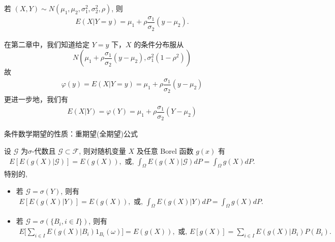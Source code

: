\documentclass[Prob-All.tex]{subfiles}
\begin{document}
\begin{frame}
	\vspace{0.3cm}
	\begin{exam}
		若 $(X,Y)\sim N (\mu_1,\mu_2,\sigma_1^2,\sigma_2^2,\rho)$, 则
		\begin{eqnarray*}
			E(X|Y=y)=\mu_1+\rho \dfrac{\sigma_1}{\sigma_2}(y-\mu_2).
		\end{eqnarray*}
	\end{exam}%
	\zheng 在第二章中，我们知道给定 $Y=y$ 下，$X$ 的条件分布服从
	\[N(\mu_1+\rho \dfrac{\sigma_1}{\sigma_2}(y-\mu_2), \sigma_1^2(1-\rho^2))\]
	\pause 故
	\begin{eqnarray*}
		\varphi(y)=E(X|Y=y)=\mu_1+\rho \dfrac{\sigma_1}{\sigma_2}(y-\mu_2)
	\end{eqnarray*}
	\pause 更进一步地，我们有
	\begin{eqnarray*}
		E(X|Y)=\varphi(Y)=\mu_1+\rho \dfrac{\sigma_1}{\sigma_2}(Y-\mu_2)
	\end{eqnarray*}
\end{frame}


\begin{frame}{条件数学期望的性质：重期望(全期望)公式}
	\begin{thm}
		设 $\mathcal{G}$ 为$\sigma$-代数且 $\mathcal{G}\subset\mathcal{F}$, 则对随机变量 $X$ 及任意 Borel 函数 $g (x)$ 有
		{\small \begin{eqnarray*}
			E[E(g(X)|\mathcal{G})]=E(g(X)), \mbox{ 或, } \int_{\Omega}E(g(X)|\mathcal{G})dP=\int_{\Omega}g(X)dP.
		\end{eqnarray*}}
		特别的,
		\begin{itemize}[<+-|alert@+>]
		\item 若 $\mathcal{G}=\sigma(Y)$, 则有
		{\small \begin{eqnarray*}
			E[E(g(X)|Y)]=E(g(X)), \mbox{ 或,  } \int_{\Omega}E(g(X)|Y)dP=\int_{\Omega}g(X)dP.
		\end{eqnarray*}}
		\item 若 $\mathcal{G}=\sigma(\{B_i, i\in I\})$, 则有
		{\small \begin{eqnarray*}
			E\bigg[\sum_{i\in I}E(g(X)|B_i)1_{B_i}(\omega)\bigg]=E(g(X)), \mbox{ 或, } E[g(X)]=\sum_{i\in I}E(g(X)|B_i)P(B_i).
		\end{eqnarray*}}
		\end{itemize}

	\end{thm}



\end{frame}
\end{document}
